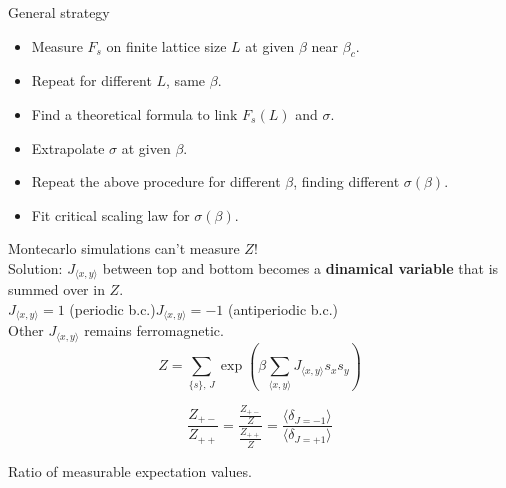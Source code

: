 \documentclass[12pt,handout]{beamer}
\begin{document}
\begin{frame}{General strategy}
\begin{center}
\begin{itemize}
\item Measure $F_s$ on finite lattice size $L$ at given $\beta$ near $\beta_c$.
\item Repeat for different $L$, same $\beta$.
\item Find a theoretical formula to link $F_s(L)$ and $\sigma$.
\item Extrapolate $\sigma$ at given $\beta$.
\item Repeat the above procedure for different $\beta$, finding different $\sigma \left(\beta \right)$.
\item Fit critical scaling law for $\sigma\left(\beta \right)$.
\end{itemize}
\end{center}
\end{frame}


\begin{frame}
\begin{center}
{\Large Montecarlo simulations can't measure $Z$!\\}
\vspace{10pt}
Solution: $J_{\langle x, y \rangle}$ between top and bottom becomes a \textbf{dinamical variable} that is summed over in $Z$.\\
$J_{\langle x, y \rangle} = 1$ (periodic b.c.)\hspace{10pt}$J_{\langle x, y \rangle} = -1$ (antiperiodic b.c.)\\
Other $J_{\langle x, y \rangle}$ remains ferromagnetic.
\[
Z = \sum_{\lbrace s \rbrace, \, J} \exp \left( \beta \sum_{\langle x, y \rangle} J_{\langle x, y \rangle} s_x s_y \right)
\]

{\large \[
\frac{Z_{+-}}{Z_{++}} = \frac{\frac{Z_{+-}}{Z}}{\frac{Z_{++}}{Z}}=\frac{\langle \delta_{J = -1} \rangle}{\langle \delta_{J = + 1} \rangle}
\]}

Ratio of measurable expectation values.
\end{center}
\end{frame}
\end{document}
